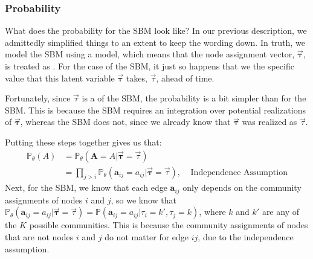 \documentclass[letterpaper,10pt,english]{jupyterBook}
\begin{document}
\subsubsection{Probability}
\label{\detokenize{representations/ch5/single-network-models_theory:id1}}
\sphinxAtStartPar
What does the probability for the  SBM look like? In our previous description, we admittedly simplified things to an extent to keep the wording down. In truth, we model the  SBM using a  model, which means that the node assignment vector, \(\vec{\pmb \tau}\), is treated as . For the case of the  SBM, it just so happens that we  the specific value that this latent variable \(\vec{\pmb \tau}\) takes, \(\vec \tau\), ahead of time.

\sphinxAtStartPar
Fortunately, since \(\vec \tau\) is a  of the  SBM, the probability is a bit simpler than for the  SBM. This is because the  SBM requires an integration over potential realizations of \(\vec{\pmb \tau}\), whereas the  SBM does not, since we already know that \(\vec{\pmb \tau}\) was realized as \(\vec\tau\).

\sphinxAtStartPar
Putting these steps together gives us that:
\begin{align*}
\mathbb P_\theta(A) &= \mathbb P_{\theta}(\mathbf A = A | \vec{\pmb \tau} = \vec\tau) \\
&= \prod_{j > i} \mathbb P_\theta(\mathbf a_{ij} = a_{ij} | \vec{\pmb \tau} = \vec\tau),\;\;\;\;\textrm{Independence Assumption}
\end{align*}
\sphinxAtStartPar
Next, for the  SBM, we know that each edge \(\mathbf a_{ij}\) only  depends on the community assignments of nodes \(i\) and \(j\), so we know that \(\mathbb P_{\theta}(\mathbf a_{ij} = a_{ij} | \vec{\pmb \tau} = \vec\tau) = \mathbb P(\mathbf a_{ij} = a_{ij} | \tau_i = k', \tau_j = k)\), where \(k\) and \(k'\) are any of the \(K\) possible communities. This is because the community assignments of nodes that are not nodes \(i\) and \(j\) do not matter for edge \(ij\), due to the independence assumption.
\end{document}
